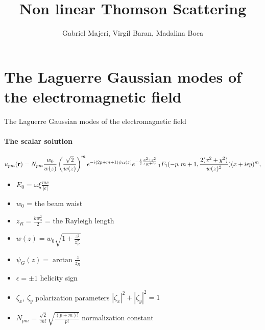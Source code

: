 \documentclass[aspectratio=169, 10pt]{beamer}
\title{Non linear Thomson Scattering}
\author{Gabriel Majeri, Virgil Baran, Madalina Boca}
\begin{document}
\begin{frame}{}
  \maketitle

\end{frame}

\begin{frame}{}
  \tableofcontents
\end{frame}
\section{The Laguerre Gaussian modes of the electromagnetic field}
\begin{frame}{The Laguerre Gaussian modes of the electromagnetic field}
  \framesubtitle{The scalar solution}
  \begin{align*}
    u_{pm}({\bf r}) = N_{pm}\frac{w_0}{w(z)}\left(\frac{\sqrt{2}}{w(z)}\right)^me^{-i(2p + m +1)\psi_G(z)}e^{-\frac{k}2\frac{x^2+y^2}{z_R+i z}}\, _1F_1(-p, m+1, \frac{2(x^2+y^2)}{w(z)^2}) (x+i\epsilon y)^m,
  \end{align*}
  \begin{itemize}
    \item  $E_0 = \omega \xi \frac{mc}{|e|}$
    \item $w_0$ = the beam waist
    \item $z_R = \frac{kw_0^2}{2}$ = the Rayleigh length
    \item $w(z) = w_0\sqrt{1+\frac{z^2}{z_R^2}}$
    \item $\psi_G(z) = \arctan\frac{z}{z_R}$
    \item $\epsilon=\pm1$ helicity sign
    \item $\zeta_x$, $\zeta_y$ polarization parameters $|\zeta_x|^2 + |\zeta_y|^2=1$
    \item $N_{pm} = \frac{\sqrt{2}}{m!}\sqrt{\frac{(p+m)!}{p!}}$ normalization constant

  \end{itemize}

\end{frame}
\end{document}
